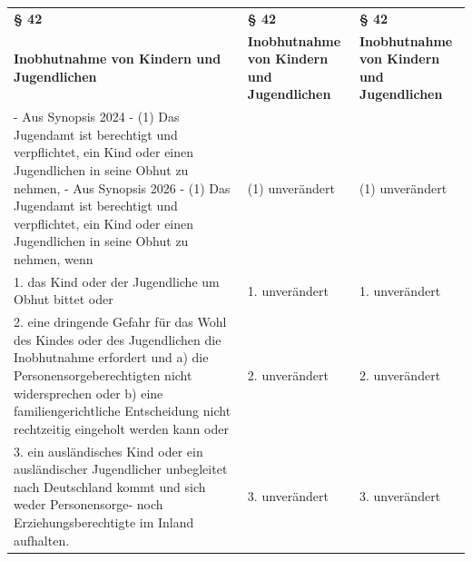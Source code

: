 \documentclass[10pt,a4paper,landscape]{article}
\begin{document}
\begin{longtable}{|L{8.2cm}|L{8.2cm}|L{8.2cm}|}
\hhline{|---|}
\textbf{\S{} 42} & \textbf{\S{} 42} & \textbf{\S{} 42} \\
\hhline{|---|}
\textbf{Inobhutnahme von Kindern und  \newline Jugendlichen} & \textbf{Inobhutnahme von Kindern und  \newline Jugendlichen} & \textbf{Inobhutnahme von Kindern und  \newline Jugendlichen} \\
\hhline{|---|}
- Aus Synopsis 2024 - \newline (1) Das Jugendamt ist berechtigt und  \newline verpflichtet, ein Kind oder einen  \newline Jugendlichen in seine Obhut zu nehmen,  \newline - Aus Synopsis 2026 - \newline (1) Das Jugendamt ist berechtigt und  \newline verpflichtet, ein Kind oder einen  \newline Jugendlichen in seine Obhut zu nehmen,  \newline wenn & (1) unverändert & (1) unverändert \\
\hhline{|---|}
1.  \newline das Kind oder der Jugendliche um Obhut  \newline bittet oder & 1. unverändert & 1. unverändert \\
\hhline{|---|}
2.  \newline eine dringende Gefahr für das Wohl des  \newline Kindes oder des Jugendlichen die  \newline Inobhutnahme erfordert und  \newline a)  \newline die Personensorgeberechtigten nicht  \newline widersprechen oder  \newline b)  \newline eine familiengerichtliche Entscheidung  \newline nicht rechtzeitig eingeholt werden kann  \newline oder & 2. unverändert & 2. unverändert \\
\hhline{|---|}
3.  \newline ein ausländisches Kind oder ein  \newline ausländischer Jugendlicher unbegleitet  \newline nach Deutschland kommt und sich weder  \newline Personensorge- noch  \newline Erziehungsberechtigte im Inland aufhalten. & 3. unverändert & 3. unverändert \\

\end{longtable}
\end{document}
